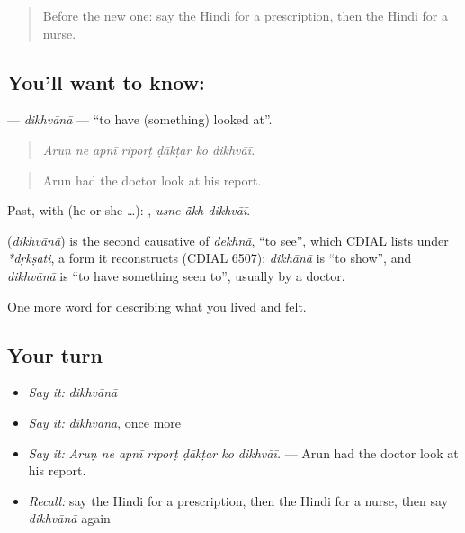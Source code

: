 \label{lesson:HI-C488-dikhvana}



\begin{quote}
Before the new one: say the Hindi for a prescription, then the Hindi for a nurse.
\end{quote}

\subsection*{You'll want to know: }
\textbf{} — \emph{dikhvānā} — \textquotedblleft{}to have (something) looked at\textquotedblright{}.

\begin{quote}
      
\end{quote}

\begin{quote}
\emph{Aruṇ ne apnī riporṭ ḍākṭar ko dikhvāī.}
\end{quote}

\begin{quote}
Arun had the doctor look at his report.
\end{quote}

Past, with  (he or she …):   , \emph{usne ā̃kh dikhvāī}.

\begin{cousinweb}
\textbf{} (\emph{dikhvānā}) is the second causative of \emph{dekhnā}, \textquotedblleft{}to see\textquotedblright{}, which CDIAL lists under \emph{*dṛkṣati}, a form it reconstructs (CDIAL 6507): \emph{dikhānā} is \textquotedblleft{}to show\textquotedblright{}, and \emph{dikhvānā} is \textquotedblleft{}to have something seen to\textquotedblright{}, usually by a doctor.
\end{cousinweb}

\begin{grammarlens}[title={What you've built}]
One more word for describing what you lived and felt.
\end{grammarlens}

\subsection*{Your turn}
\begin{itemize}
\raggedright
  \item \emph{Say it:} \emph{dikhvānā}
  \item \emph{Say it:} \emph{dikhvānā}, once more
  \item \emph{Say it:} \emph{Aruṇ ne apnī riporṭ ḍākṭar ko dikhvāī.} — Arun had the doctor look at his report.
  \item \emph{Recall:} say the Hindi for a prescription, then the Hindi for a nurse, then say \emph{dikhvānā} again
\end{itemize}

